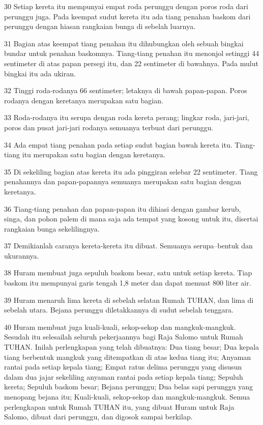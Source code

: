 \par 30 Setiap kereta itu mempunyai empat roda perunggu dengan poros roda dari perunggu juga. Pada keempat sudut kereta itu ada tiang penahan baskom dari perunggu dengan hiasan rangkaian bunga di sebelah luarnya.
\par 31 Bagian atas keempat tiang penahan itu dihubungkan oleh sebuah bingkai bundar untuk penahan baskomnya. Tiang-tiang penahan itu menonjol setinggi 44 sentimeter di atas papan persegi itu, dan 22 sentimeter di bawahnya. Pada mulut bingkai itu ada ukiran.
\par 32 Tinggi roda-rodanya 66 sentimeter; letaknya di bawah papan-papan. Poros rodanya dengan keretanya merupakan satu bagian.
\par 33 Roda-rodanya itu serupa dengan roda kereta perang; lingkar roda, jari-jari, poros dan pusat jari-jari rodanya semuanya terbuat dari perunggu.
\par 34 Ada empat tiang penahan pada setiap sudut bagian bawah kereta itu. Tiang-tiang itu merupakan satu bagian dengan keretanya.
\par 35 Di sekeliling bagian atas kereta itu ada pinggiran selebar 22 sentimeter. Tiang penahannya dan papan-papannya semuanya merupakan satu bagian dengan keretanya.
\par 36 Tiang-tiang penahan dan papan-papan itu dihiasi dengan gambar kerub, singa, dan pohon palem di mana saja ada tempat yang kosong untuk itu, disertai rangkaian bunga sekelilingnya.
\par 37 Demikianlah caranya kereta-kereta itu dibuat. Semuanya serupa--bentuk dan ukurannya.
\par 38 Huram membuat juga sepuluh baskom besar, satu untuk setiap kereta. Tiap baskom itu mempunyai garis tengah 1,8 meter dan dapat memuat 800 liter air.
\par 39 Huram menaruh lima kereta di sebelah selatan Rumah TUHAN, dan lima di sebelah utara. Bejana perunggu diletakkannya di sudut sebelah tenggara.
\par 40 Huram membuat juga kuali-kuali, sekop-sekop dan mangkuk-mangkuk. Sesudah itu selesailah seluruh pekerjaannya bagi Raja Salomo untuk Rumah TUHAN. Inilah perlengkapan yang telah dibuatnya: Dua tiang besar; Dua kepala tiang berbentuk mangkuk yang ditempatkan di atas kedua tiang itu; Anyaman rantai pada setiap kepala tiang; Empat ratus delima perunggu yang disusun dalam dua jajar sekeliling anyaman rantai pada setiap kepala tiang; Sepuluh kereta; Sepuluh baskom besar; Bejana perunggu; Dua belas sapi perunggu yang menopang bejana itu; Kuali-kuali, sekop-sekop dan mangkuk-mangkuk. Semua perlengkapan untuk Rumah TUHAN itu, yang dibuat Huram untuk Raja Salomo, dibuat dari perunggu, dan digosok sampai berkilap.
